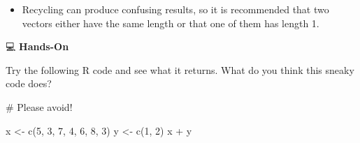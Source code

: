 \documentclass[
  letterpaper,
  DIV=11,
  numbers=noendperiod]{scrreprt}
\newenvironment{Shaded}{\begin{snugshade}}{\end{snugshade}}
\newcommand{\CommentTok}[1]{\textcolor[rgb]{0.37,0.37,0.37}{#1}}
\newcommand{\DecValTok}[1]{\textcolor[rgb]{0.68,0.00,0.00}{#1}}
\newcommand{\FunctionTok}[1]{\textcolor[rgb]{0.28,0.35,0.67}{#1}}
\newcommand{\NormalTok}[1]{\textcolor[rgb]{0.00,0.23,0.31}{#1}}
\newcommand{\OtherTok}[1]{\textcolor[rgb]{0.00,0.23,0.31}{#1}}
\newcommand{\SpecialCharTok}[1]{\textcolor[rgb]{0.37,0.37,0.37}{#1}}
\providecommand{\tightlist}{%
  \setlength{\itemsep}{0pt}\setlength{\parskip}{0pt}}\usepackage{longtable,booktabs,array}
\begin{document}
\begin{itemize}
\tightlist
\item
  Recycling can produce confusing results, so it is recommended that two
  vectors either have the same length or that one of them has length 1.
\end{itemize}

💻 \textbf{Hands-On}

Try the following R code and see what it returns. What do you think this
sneaky code does?

\begin{Shaded}
\begin{Highlighting}[]
\CommentTok{\# Please avoid!}

\NormalTok{x }\OtherTok{\textless{}{-}} \FunctionTok{c}\NormalTok{(}\DecValTok{5}\NormalTok{, }\DecValTok{3}\NormalTok{, }\DecValTok{7}\NormalTok{, }\DecValTok{4}\NormalTok{, }\DecValTok{6}\NormalTok{, }\DecValTok{8}\NormalTok{, }\DecValTok{3}\NormalTok{)}
\NormalTok{y }\OtherTok{\textless{}{-}} \FunctionTok{c}\NormalTok{(}\DecValTok{1}\NormalTok{, }\DecValTok{2}\NormalTok{)}
\NormalTok{x }\SpecialCharTok{+}\NormalTok{ y}
\end{Highlighting}
\end{Shaded}
\end{document}
